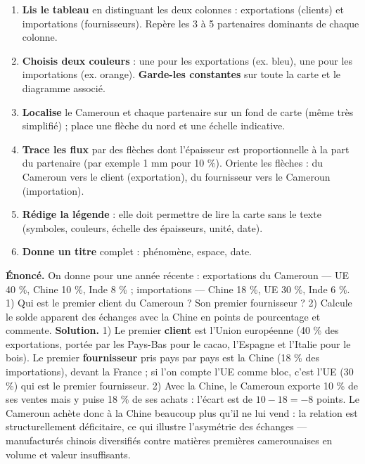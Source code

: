 \documentclass[11pt]{article}
\begin{document}
\begin{methode}
\begin{enumerate}
\item \textbf{Lis le tableau} en distinguant les deux colonnes : exportations (clients) et importations (fournisseurs). Repère les 3 à 5 partenaires dominants de chaque colonne.
\item \textbf{Choisis deux couleurs} : une pour les exportations (ex. bleu), une pour les importations (ex. orange). \textbf{Garde-les constantes} sur toute la carte et le diagramme associé.
\item \textbf{Localise} le Cameroun et chaque partenaire sur un fond de carte (même très simplifié) ; place une flèche du nord et une échelle indicative.
\item \textbf{Trace les flux} par des flèches dont l'épaisseur est proportionnelle à la part du partenaire (par exemple 1 mm pour 10 \%). Oriente les flèches : du Cameroun vers le client (exportation), du fournisseur vers le Cameroun (importation).
\item \textbf{Rédige la légende} : elle doit permettre de lire la carte sans le texte (symboles, couleurs, échelle des épaisseurs, unité, date).
\item \textbf{Donne un titre} complet : phénomène, espace, date.
\end{enumerate}
\end{methode}

\begin{exoresolu}
\textbf{Énoncé.} On donne pour une année récente : exportations du Cameroun — UE 40 \%, Chine 10 \%, Inde 8 \% ; importations — Chine 18 \%, UE 30 \%, Inde 6 \%. 1) Qui est le premier client du Cameroun ? Son premier fournisseur ? 2) Calcule le solde apparent des échanges avec la Chine en points de pourcentage et commente.
\tcblower
\textbf{Solution.} 1) Le premier \textbf{client} est l'Union européenne (40 \% des exportations, portée par les Pays-Bas pour le cacao, l'Espagne et l'Italie pour le bois). Le premier \textbf{fournisseur} pris pays par pays est la Chine (18 \% des importations), devant la France ; si l'on compte l'UE comme bloc, c'est l'UE (30 \%) qui est le premier fournisseur. 2) Avec la Chine, le Cameroun exporte 10 \% de ses ventes mais y puise 18 \% de ses achats : l'écart est de $10 - 18 = -8$ points. Le Cameroun achète donc à la Chine beaucoup plus qu'il ne lui vend : la relation est structurellement déficitaire, ce qui illustre l'asymétrie des échanges — manufacturés chinois diversifiés contre matières premières camerounaises en volume et valeur insuffisants.
\end{exoresolu}
\end{document}
